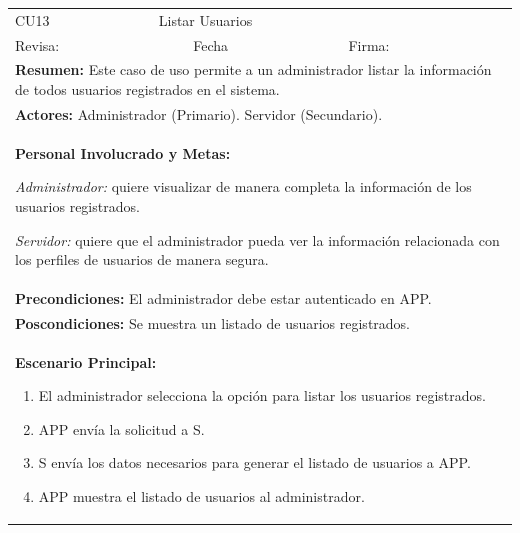\begin{longtable}{|l|p{5.5cm}|l|p{2cm}|l|p{1.9cm}|} \hline
    \cellcolor{grisOscuro} CU13 & \multicolumn{4}{|l|}{  \cellcolor{grisOscuro} Listar Usuarios} &  \cellcolor{grisClaro}\multirow{2}{1cm}{} \\ \cline{1-5}
    \cellcolor{grisOscuro} Revisa: &  \cellcolor{grisClaro} &  \cellcolor{grisOscuro} Fecha &  \cellcolor{grisClaro} &  \cellcolor{grisOscuro} Firma: & \cellcolor{grisClaro} \\ \hline
    \multicolumn{6}{|p{15cm}|}{ \textbf{Resumen: } Este caso de uso permite a un administrador listar la información de todos usuarios registrados en el sistema.

    } \\ \hline

    \multicolumn{6}{|p{15cm}|}{ \textbf{Actores: } Administrador (Primario). Servidor (Secundario).

    } \\ \hline

    \multicolumn{6}{|p{15cm}|}{ \textbf{Personal Involucrado y Metas: }

    \emph{Administrador:} quiere visualizar de manera completa la información de los usuarios registrados.

    \emph{Servidor:} quiere que el administrador pueda ver la información relacionada con los perfiles de usuarios de manera segura.

    } \\ \hline

    \multicolumn{6}{|p{15cm}|}{ \textbf{Precondiciones: } El administrador debe estar autenticado en APP.

    } \\ \hline

    \multicolumn{6}{|p{15cm}|}{ \textbf{Poscondiciones: } Se muestra un listado de usuarios registrados.

    } \\ \hline

    \multicolumn{6}{|p{15cm}|}{ \textbf{Escenario Principal: }

    \begin{enumerate}
        \item El administrador selecciona la opción para listar los usuarios registrados.
        \item APP envía la solicitud a S.
        \item S envía los datos necesarios para generar el listado de usuarios a APP.
        \item APP muestra el listado de usuarios al administrador.
    \end{enumerate}

}
\end{longtable}
